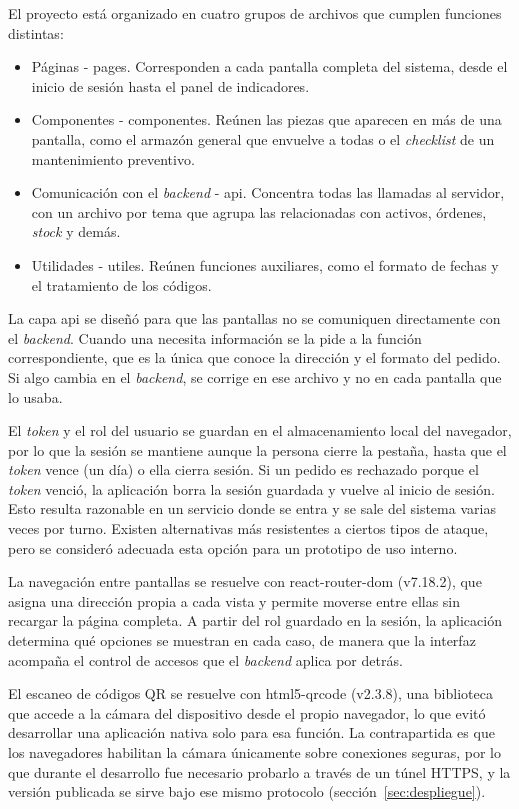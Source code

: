 \documentclass[10pt]{article}
\begin{document}
El proyecto está organizado en cuatro grupos de archivos que cumplen funciones distintas: 
\begin{itemize}
    \item Páginas - pages. Corresponden a cada pantalla completa del sistema, desde el inicio de sesión hasta el panel de indicadores. 
    \item Componentes - componentes. Reúnen las piezas que aparecen en más de una pantalla, como el armazón general que envuelve a todas o el \textit{checklist} de un mantenimiento preventivo. 
    \item Comunicación con el \textit{backend} - api. Concentra todas las llamadas al servidor, con un archivo por tema que agrupa las relacionadas con activos, órdenes, \textit{stock} y demás.
    \item Utilidades - utiles. Reúnen funciones auxiliares, como el formato de fechas y el tratamiento de los códigos.
\end{itemize}
La capa api se diseñó para que las pantallas no se comuniquen directamente con el \textit{backend}. Cuando una necesita información se la pide a la función correspondiente, que es la única que conoce la dirección y el formato del pedido. Si algo cambia en el \textit{backend}, se corrige en ese archivo y no en cada pantalla que lo usaba. 

El \textit{token} y el rol del usuario se guardan en el almacenamiento local del navegador, por lo que la sesión se mantiene aunque la persona cierre la pestaña, hasta que el \textit{token} vence (un día) o ella cierra sesión. Si un pedido es rechazado porque el \textit{token} venció, la aplicación borra la sesión guardada y vuelve al inicio de sesión. Esto resulta razonable en un servicio donde se entra y se sale del sistema varias veces por turno. Existen alternativas más resistentes a ciertos tipos de ataque, pero se consideró adecuada esta opción para un prototipo de uso interno. 

La navegación entre pantallas se resuelve con react-router-dom (v7.18.2), que asigna una dirección propia a cada vista y permite moverse entre ellas sin recargar la página completa. A partir del rol guardado en la sesión, la aplicación determina qué opciones se muestran en cada caso, de manera que la interfaz acompaña el control de accesos que el \textit{backend} aplica por detrás. 

El escaneo de códigos QR se resuelve con html5-qrcode (v2.3.8), una biblioteca que accede a la cámara del dispositivo desde el propio navegador, lo que evitó desarrollar una aplicación nativa solo para esa función. La contrapartida es que los navegadores habilitan la cámara únicamente sobre conexiones seguras, por lo que durante el desarrollo fue necesario probarlo a través de un túnel HTTPS, y la versión publicada se sirve bajo ese mismo protocolo (sección~\ref{sec:despliegue}). 
\end{document}
